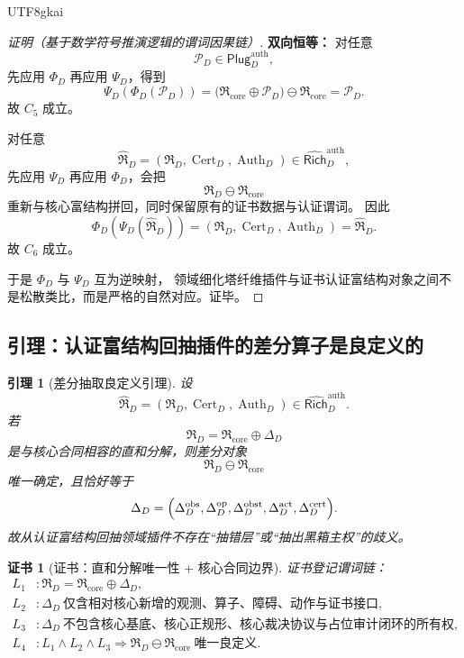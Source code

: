 \documentclass[12pt]{article}
\newtheorem{lemma}{引理}[section]
\newtheorem{Certificate}{证书}[section]
\newcommand{\Cert}{\operatorname{Cert}}
\newcommand{\Auth}{\operatorname{Auth}}
\begin{document}
\begin{CJK*}{UTF8}{gkai}
\begin{proof}[证明（基于数学符号推演逻辑的谓词因果链）]
\textbf{双向恒等：}
对任意
\[
  \mathcal P_D\in \mathsf{Plug}_D^{\mathrm{auth}},
\]
先应用 $\Phi_D$ 再应用 $\Psi_D$，得到
\[
  \Psi_D(\Phi_D(\mathcal P_D))
  =
  \bigl(\mathfrak R_{\mathrm{core}}\oplus \mathcal P_D\bigr)
  \ominus
  \mathfrak R_{\mathrm{core}}
  =
  \mathcal P_D.
\]
故 $C_5$ 成立。

对任意
\[
  \widehat{\mathfrak R}_D=(\mathfrak R_D,\Cert_D,\Auth_D)
  \in
  \widehat{\mathsf{Rich}}_D^{\mathrm{auth}},
\]
先应用 $\Psi_D$ 再应用 $\Phi_D$，会把
\[
  \mathfrak R_D\ominus \mathfrak R_{\mathrm{core}}
\]
重新与核心富结构拼回，同时保留原有的证书数据与认证谓词。
因此
\[
  \Phi_D(\Psi_D(\widehat{\mathfrak R}_D))
  =
  (\mathfrak R_D,\Cert_D,\Auth_D)
  =
  \widehat{\mathfrak R}_D.
\]
故 $C_6$ 成立。

于是 $\Phi_D$ 与 $\Psi_D$ 互为逆映射，
领域细化塔纤维插件与证书认证富结构对象之间不是松散类比，而是严格的自然对应。证毕。
\end{proof}

\subsection{引理：认证富结构回抽插件的差分算子是良定义的}
\label{subsec:tex37-ch8-lemma}

\begin{lemma}[差分抽取良定义引理]
\label{lem:tex37-ch8-difference}
设
\[
  \widehat{\mathfrak R}_D=(\mathfrak R_D,\Cert_D,\Auth_D)
  \in
  \widehat{\mathsf{Rich}}_D^{\mathrm{auth}}.
\]
若
\[
  \mathfrak R_D
  =
  \mathfrak R_{\mathrm{core}}
  \oplus
  \Delta_D
\]
是与核心合同相容的直和分解，则差分对象
\[
  \mathfrak R_D\ominus \mathfrak R_{\mathrm{core}}
\]
唯一确定，且恰好等于
\[
  \Delta_D
  =
  \Bigl(
    \Delta_D^{\mathrm{obs}},
    \Delta_D^{\mathrm{op}},
    \Delta_D^{\mathrm{obst}},
    \Delta_D^{\mathrm{act}},
    \Delta_D^{\mathrm{cert}}
  \Bigr).
\]
故从认证富结构回抽领域插件不存在“抽错层”或“抽出黑箱主权”的歧义。
\end{lemma}

\begin{Certificate}[证书：直和分解唯一性 + 核心合同边界]
\label{cert:tex37-ch8-difference}
证书登记谓词链：
\[
\begin{aligned}
  L_1 &: \mathfrak R_D=\mathfrak R_{\mathrm{core}}\oplus \Delta_D,\\
  L_2 &: \Delta_D\ \text{仅含相对核心新增的观测、算子、障碍、动作与证书接口},\\
  L_3 &: \Delta_D\ \text{不包含核心基底、核心正规形、核心裁决协议与占位审计闭环的所有权},\\
  L_4 &: L_1\wedge L_2\wedge L_3\Rightarrow \mathfrak R_D\ominus \mathfrak R_{\mathrm{core}}\ \text{唯一良定义}.
\end{aligned}
\]
\end{Certificate}


\end{CJK*}
\end{document}
